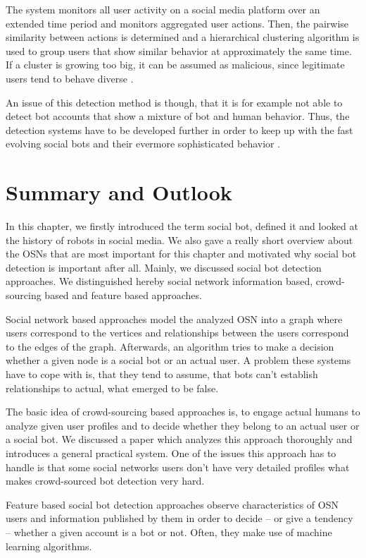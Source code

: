 The system monitors all user activity on a social media platform over an extended time period and monitors aggregated user actions. Then, the pairwise similarity between actions is determined and a hierarchical clustering algorithm is used to group users that show similar behavior at approximately the same time. If a cluster is growing too big, it can be assumed as malicious, since legitimate users tend to behave diverse \cite{synchrotrap}.

An issue of this detection method is though, that it is for example not able to detect bot accounts that show a mixture of bot and human behavior. Thus, the detection systems have to be developed further in order to keep up with the fast evolving social bots and their evermore sophisticated behavior \cite{ferrara15}.


\section{Summary and Outlook}
In this chapter, we firstly introduced the term social bot, defined it and looked at the history of robots in social media.  We also gave a really short overview about the OSNs that are most important for this chapter and motivated why social bot detection is important after all. Mainly, we discussed social bot detection approaches. We distinguished hereby social network information based, crowd-sourcing based and feature based approaches. 

Social network based approaches model the analyzed OSN into a graph where users correspond to the vertices and relationships between the users correspond to the edges of the graph. Afterwards, an algorithm tries to make a decision whether a given node is a social bot or an actual user. A problem these systems have to cope with is, that they tend to assume, that bots can't establish relationships to actual, what emerged to be false.

The basic idea of crowd-sourcing based approaches is, to engage actual humans to analyze given user profiles and to decide whether they belong to an actual user or a social bot. We discussed a paper which analyzes this approach thoroughly and introduces a general practical system. One of the issues this approach has to handle is that some social networks users don't have very detailed profiles what makes crowd-sourced bot detection very hard. 

Feature based social bot detection approaches observe characteristics of OSN users and information published by them in order to decide -- or give a tendency -- whether a given account is a bot or not. Often, they make use of machine learning algorithms. 

